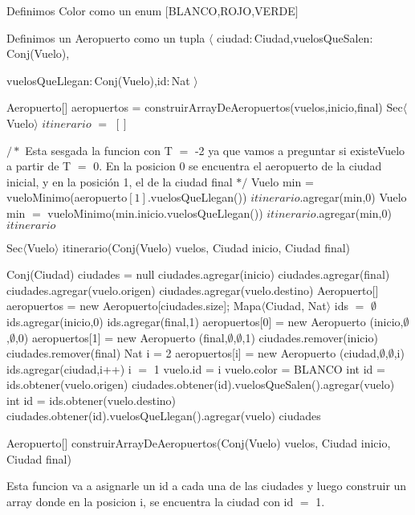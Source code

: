Definimos Color como un enum $[$BLANCO,ROJO,VERDE$]$

Definimos un Aeropuerto como un tupla $\langle$ ciudad$:$Ciudad,vuelosQueSalen$:
$Conj(Vuelo),

vuelosQueLlegan$:$Conj(Vuelo),id$:$Nat $\rangle$ 


\begin{algorithm}[H]
\begin{algorithmic}[1]
\STATE Aeropuerto[] aeropuertos = construirArrayDeAeropuertos(vuelos,inicio,final)
\STATE Sec$\langle$Vuelo$\rangle$ $itinerario$ $=$ $[]$

$/*$ Esta sesgada la funcion con T $=$ -2 ya que vamos a preguntar si existeVuelo a partir de T $=$ 0.
En la posicion 0 se encuentra el aeropuerto de la ciudad inicial, y en la posici\'on 1, el de la ciudad final $*/$
	\STATE Vuelo min = vueloMinimo(aeropuerto$[1]$.vuelosQueLlegan())
\STATE $itinerario$.agregar(min,0)
	\STATE Vuelo min $=$ vueloMinimo(min.inicio.vuelosQueLlegan())
	\STATE $itinerario$.agregar(min,0)
\ENDWHILE
\ENDIF
\RETURN $itinerario$
\caption{Sec$\langle$Vuelo$\rangle$ itinerario(Conj(Vuelo) vuelos, Ciudad inicio, Ciudad final)}%
\end{algorithmic}
\end{algorithm}


\begin{algorithm}[H]
\begin{algorithmic}[1]
\STATE Conj(Ciudad) ciudades = null
\STATE ciudades.agregar(inicio)
\STATE ciudades.agregar(final)
	\STATE ciudades.agregar(vuelo.origen)
	\STATE ciudades.agregar(vuelo.destino)
\ENDFOR
\STATE Aeropuerto[] aeropuertos = new Aeropuerto[ciudades.size];
\STATE Mapa$\langle$Ciudad, Nat$\rangle$ ids $=$ $\emptyset$
\STATE ids.agregar(inicio,0)
\STATE ids.agregar(final,1)
\STATE aeropuertos[0] = new Aeropuerto (inicio,$\emptyset$,$\emptyset$,0)
\STATE aeropuertos[1] = new Aeropuerto (final,$\emptyset$,$\emptyset$,1)
\STATE ciudades.remover(inicio)
\STATE ciudades.remover(final)
\STATE Nat i = 2
	\STATE aeropuertos[i] = new Aeropuerto (ciudad,$\emptyset$,$\emptyset$,i)
	\STATE ids.agregar(ciudad,i++)
\ENDFOR
\STATE i $=$ 1
	\STATE vuelo.id = i	
	\STATE vuelo.color = BLANCO	
	\STATE int id = ids.obtener(vuelo.origen)
	\STATE ciudades.obtener(id).vuelosQueSalen().agregar(vuelo)
	\STATE int id = ids.obtener(vuelo.destino)
	\STATE ciudades.obtener(id).vuelosQueLlegan().agregar(vuelo)
\ENDFOR
\RETURN ciudades
\caption{Aeropuerto[] construirArrayDeAeropuertos(Conj(Vuelo) vuelos, Ciudad inicio, Ciudad final)}%
\end{algorithmic}
\end{algorithm}
Esta funcion va a asignarle un id a cada una de las ciudades y luego construir un array donde en la posicion i, se encuentra la ciudad con id $=$ 1.

